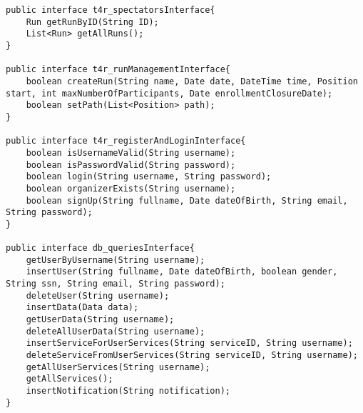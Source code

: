 \documentclass[../../DD.tex]{subfiles}
\begin{document}
\begin{lstlisting}
public interface t4r_spectatorsInterface{
	Run getRunByID(String ID);
	List<Run> getAllRuns();
}

public interface t4r_runManagementInterface{
	boolean createRun(String name, Date date, DateTime time, Position start, int maxNumberOfParticipants, Date enrollmentClosureDate);
	boolean setPath(List<Position> path);
}

public interface t4r_registerAndLoginInterface{
	boolean isUsernameValid(String username);
	boolean isPasswordValid(String password);
	boolean login(String username, String password);
	boolean organizerExists(String username);
	boolean signUp(String fullname, Date dateOfBirth, String email, String password);
}

public interface db_queriesInterface{
	getUserByUsername(String username);
	insertUser(String fullname, Date dateOfBirth, boolean gender, String ssn, String email, String password);
	deleteUser(String username);
	insertData(Data data);
	getUserData(String username);
	deleteAllUserData(String username);
	insertServiceForUserServices(String serviceID, String username);
	deleteServiceFromUserServices(String serviceID, String username);
	getAllUserServices(String username);
	getAllServices();
	insertNotification(String notification);
}
\end{lstlisting}
\end{document}
